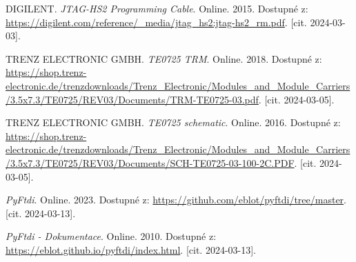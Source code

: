 \begin{thebibliography}{99}
DIGILENT. \textit{JTAG-HS2 Programming Cable}. Online. 2015. Dostupné z: \url{https://digilent.com/reference/\_media/jtag\_hs2:jtag-hs2\_rm.pdf}. [cit. 2024-03-03].

TRENZ ELECTRONIC GMBH. \textit{TE0725 TRM}. Online. 2018. Dostupné z: \url{https://shop.trenz-electronic.de/trenzdownloads/Trenz\_Electronic/Modules\_and\_Module\_Carriers/3.5x7.3/TE0725/REV03/Documents/TRM-TE0725-03.pdf}. [cit. 2024-03-05].

TRENZ ELECTRONIC GMBH. \textit{TE0725 schematic}. Online. 2016. Dostupné z: \url{https://shop.trenz-electronic.de/trenzdownloads/Trenz\_Electronic/Modules\_and\_Module\_Carriers/3.5x7.3/TE0725/REV03/Documents/SCH-TE0725-03-100-2C.PDF}. [cit. 2024-03-05].

\textit{PyFtdi}. Online. 2023. Dostupné z: \url{https://github.com/eblot/pyftdi/tree/master}. [cit. 2024-03-13].

\textit{PyFtdi - Dokumentace}. Online. 2010. Dostupné z: \url{https://eblot.github.io/pyftdi/index.html}. [cit. 2024-03-13].

\end{thebibliography}


%
%
%
